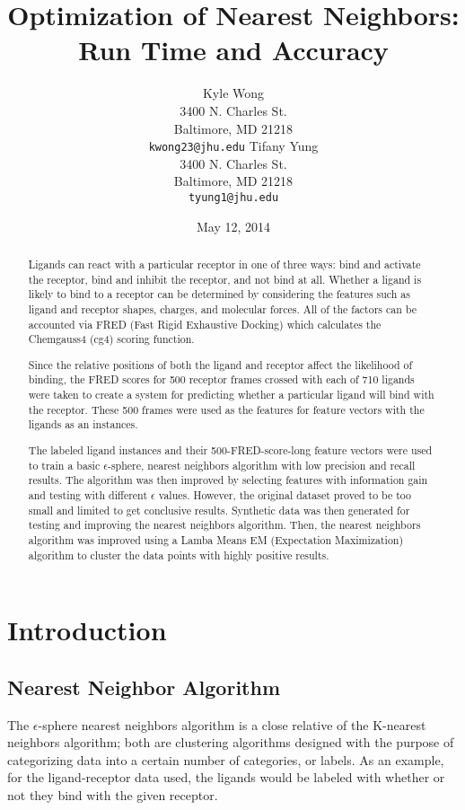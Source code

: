 \documentclass[11pt,letterpaper]{article}
\title{Optimization of Nearest Neighbors: Run Time and Accuracy}
\author{Kyle Wong \\
  3400 N. Charles St. \\
  Baltimore, MD 21218 \\
  {\tt kwong23@jhu.edu}
  \And
  Tifany Yung \\
  3400 N. Charles St. \\
  Baltimore, MD 21218 \\
  {\tt tyung1@jhu.edu}}
\date{May 12, 2014}
\begin{document}
\maketitle
\begin{abstract}
Ligands can react with a particular receptor in one of three ways: bind and activate the receptor, bind and inhibit the receptor, and not bind at all. Whether a ligand is likely to bind to a receptor can be determined by considering the features such as ligand and receptor shapes, charges, and molecular forces. All of the factors can be accounted via FRED (Fast Rigid Exhaustive Docking) which calculates the Chemgauss4 (cg4) scoring function.

Since the relative positions of both the ligand and receptor affect the likelihood of binding, the FRED scores for 500 receptor frames crossed with each of 710 ligands were taken to create a system for predicting whether a particular ligand will bind with the receptor. These 500 frames were used as the features for feature vectors with the ligands as an instances.

The labeled ligand instances and their 500-FRED-score-long feature vectors were used to train a basic $\epsilon$-sphere, nearest neighbors algorithm with low precision and recall results. The algorithm was then improved by selecting features with information gain and testing with different $\epsilon$ values.  However, the original dataset proved to be too small and limited to get conclusive results.  Synthetic data was then generated for testing and improving the nearest neighbors algorithm.  Then, the nearest neighbors algorithm was improved using a Lamba Means EM (Expectation Maximization) algorithm to cluster the data points with highly positive results.  
\end{abstract}

\section{Introduction}
\subsection{Nearest Neighbor Algorithm}

The $\epsilon$-sphere nearest neighbors algorithm is a close relative of the K-nearest neighbors algorithm; both are clustering algorithms designed with the purpose of categorizing data into a certain number of categories, or labels. As an example, for the ligand-receptor data used, the ligands would be labeled with whether or not they bind with the given receptor.
\end{document}
